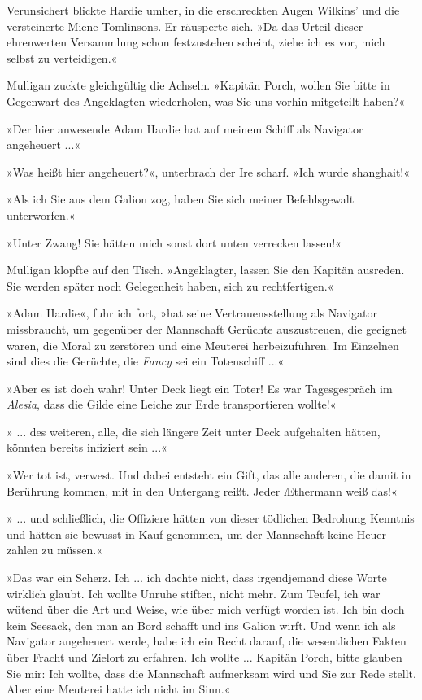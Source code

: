 Verunsichert blickte Hardie umher, in die erschreckten Augen
Wilkins’ und die versteinerte Miene Tomlinsons. Er räusperte sich.
»Da das Urteil dieser ehrenwerten Versammlung schon festzustehen
scheint, ziehe ich es vor, mich selbst zu verteidigen.«

Mulligan zuckte gleichgültig die Achseln. »Kapitän Porch, wollen
Sie bitte in Gegenwart des Angeklagten wiederholen, was Sie uns
vorhin mitgeteilt haben?«

»Der hier anwesende Adam Hardie hat auf meinem Schiff als Navigator
angeheuert ...«

»Was heißt hier angeheuert?«, unterbrach der Ire scharf. »Ich wurde
shanghait!«

»Als ich Sie aus dem Galion zog, haben Sie sich meiner
Befehlsgewalt unterworfen.«

»Unter Zwang! Sie hätten mich sonst dort unten verrecken lassen!«

Mulligan klopfte auf den Tisch. »Angeklagter, lassen Sie den
Kapitän ausreden. Sie werden später noch Gelegenheit haben, sich zu
rechtfertigen.«

»Adam Hardie«, fuhr ich fort, »hat seine Vertrauensstellung als
Navigator missbraucht, um gegenüber der Mannschaft Gerüchte
auszustreuen, die geeignet waren, die Moral zu zerstören und eine
Meuterei herbeizuführen. Im Einzelnen sind dies die Gerüchte, die
\emph{Fancy} sei ein Totenschiff ...«

»Aber es ist doch wahr! Unter Deck liegt ein Toter! Es war
Tagesgespräch im \emph{Alesia}, dass die Gilde eine Leiche zur Erde
transportieren wollte!«

» ... des weiteren, alle, die sich längere Zeit unter Deck
aufgehalten hätten, könnten bereits infiziert sein ...«

»Wer tot ist, verwest. Und dabei entsteht ein Gift, das alle
anderen, die damit in Berührung kommen, mit in den Untergang reißt.
Jeder Æthermann weiß das!«

» ... und schließlich, die Offiziere hätten von dieser tödlichen
Bedrohung Kenntnis und hätten sie bewusst in Kauf genommen, um der
Mannschaft keine Heuer zahlen zu müssen.«

»Das war ein Scherz. Ich ... ich dachte nicht, dass irgendjemand
diese Worte wirklich glaubt. Ich wollte Unruhe stiften, nicht mehr.
Zum Teufel, ich war wütend über die Art und Weise, wie über mich
verfügt worden ist. Ich bin doch kein Seesack, den man an Bord
schafft und ins Galion wirft. Und wenn ich als Navigator angeheuert
werde, habe ich ein Recht darauf, die wesentlichen Fakten über
Fracht und Zielort zu erfahren. Ich wollte ... Kapitän Porch, bitte
glauben Sie mir: Ich wollte, dass die Mannschaft aufmerksam wird
und Sie zur Rede stellt. Aber eine Meuterei hatte ich nicht im
Sinn.«


